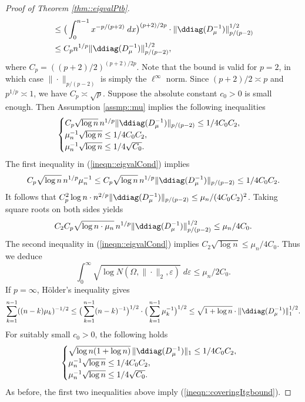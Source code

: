 \documentclass[12pt]{article}%
\theoremstyle{plain}%
\theoremstyle{remark}
\begin{document}
\begin{proof}[Proof of Theorem \ref{thm::eigvalPtb}]
\begin{align*}
&\le \big( \int_0^{n-1} x^{-p/(p+2)} \; dx\big)^{(p+2)/2p} \cdot \| \ddiag(D_\mu^{-1}) \|_{p/(p-2)}^{1/2} \\
&\le C_p n^{1/p} \| \ddiag(D_\mu^{-1}) \|_{p/(p-2)}^{1/2},
\end{align*}
where $C_p = ( (p+2)/2 )^{(p+2)/2p}$. Note that the bound is valid for $p=2$, in which case $\| \cdot \|_{p / (p-2)}$ is simply the $\ell^\infty$ norm. Since $(p+2)/2 \asymp p$ and $p^{1/p} \asymp 1$, we have $C_p \asymp \sqrt{p}$. Suppose the absolute constant $c_0>0$ is small enough. Then Assumption \ref{assmp::mu} implies the following inequalities
\begin{equation}\label{ineqn::eigvalCond}
\begin{cases}
C_p \sqrt{\log n}\, n^{1/p} \| \ddiag(D_\mu^{-1}) \|_{p/(p-2)} \le 1/4C_0C_2, \\
\mu_n^{-1} \sqrt{\log n} \le 1/4C_0C_2, \\
\mu_n^{-1} \sqrt{\log n} \le 1 / 4 \sqrt{C_0}.
\end{cases}
\end{equation}
The first inequality in (\ref{ineqn::eigvalCond}) implies 
\begin{equation}
C_p \sqrt{\log n}\, n^{1/p} \mu_n^{-1} \le C_p \sqrt{\log n}\, n^{1/p} \| \ddiag(D_\mu^{-1}) \|_{p/(p-2)} \le 1/4C_0C_2.
\end{equation}
It follows that $C_p^2 \log n \cdot n^{2/p} \| \ddiag(D_\mu^{-1}) \|_{p/(p-2)} \le \mu_n/(4C_0C_2)^2$. Taking square roots on both sides yields
\begin{equation*}
C_2C_p \sqrt{\log n \cdot \mu_n}\, n^{1/p} \| \ddiag(D_\mu^{-1}) \|_{p/(p-2)}^{1/2} \le \mu_n/4C_0.
\end{equation*}
The second inequality in (\ref{ineqn::eigvalCond}) implies  $C_2\sqrt{\log n} \le \mu_n/4C_0$. Thus we deduce
\begin{equation}\label{ineqn::coveringItgbound}
\int_0^{\infty}\sqrt{\log N(\Omega, \| \cdot \|_2, \varepsilon)} \; d\varepsilon \le \mu_n/2C_0.
\end{equation}
If $p = \infty$, H\"{o}lder's inequality gives
\begin{equation*}
\sum_{k=1}^{n-1}( (n-k)\mu_k)^{-1/2} \le  \big( \sum_{k=1}^{n-1} (n-k)^{-1} \big)^{1/2} \cdot \big( \sum_{k=1}^{n-1} \mu_k^{-1} \big)^{1/2} \le \sqrt{1 + \log n} \cdot \| \ddiag(D_{\mu}^{-1}) \|_{1}^{1/2}.
\end{equation*}
For suitably small $c_0 > 0$, the following holds
\begin{equation}\label{ineqn::eigvalCond2}
\begin{cases}
\sqrt{\log n ( 1 + \log n)}\,  \| \ddiag(D_\mu^{-1}) \|_{1} \le 1/4C_0C_2, \\
\mu_n^{-1} \sqrt{\log n} \le 1/4C_0C_2, \\
\mu_n^{-1} \sqrt{\log n} \le 1 / 4 \sqrt{C_0}.
\end{cases}
\end{equation}
As before, the first two inequalities above imply (\ref{ineqn::coveringItgbound}).


\end{proof}
\end{document}

